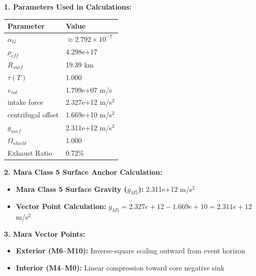 \documentclass[11pt, a4paper]{article}
\begin{document}
\vspace{0.5em}
\noindent \textbf{1. Parameters Used in Calculations:}
\begin{center}
  \begin{tabular}{|l|l|}
    \hline
    \textbf{Parameter} & \textbf{Value} \\ \hline
    $\alpha_G$ & $\approx 2.792 \times 10^{-7}$ \\ \hline
    $\rho_{eff}$ & 4.298e+17 \\ \hline
    $R_{surf}$ & 19.39 km \\ \hline
    $\tau(T)$ & 1.000 \\ \hline
    $v_{rot}$ & 1.799e+07 m/s \\ \hline
    intake force & 2.327e+12 m/s$^2$ \\ \hline
    centrifugal offset & 1.669e+10 m/s$^2$ \\ \hline
    $g_{surf}$ & 2.311e+12 m/s$^2$ \\ \hline
    $\Omega_{shield}$ & 1.000 \\ \hline
    Exhaust Ratio & 0.72\% \\ \hline
  \end{tabular}
\end{center}

\vspace{0.5em}
\noindent \textbf{2. Mara Class 5 Surface Anchor Calculation:}
\begin{itemize}
  \item \textbf{Mara Class 5 Surface Gravity ($g_{M5}$):} 2.311e+12 m/s$^2$
  \item \textbf{Vector Point Calculation:} $g_{M5} = 2.327e+12 - 1.669e+10 = 2.311e+12$ m/s$^2$
\end{itemize}

\vspace{0.5em}
\noindent \textbf{3. Mara Vector Points:}
\begin{itemize}
  \item \textbf{Exterior (M6--M10):} Inverse-square scaling outward from event horizon
  \item \textbf{Interior (M4--M0):} Linear compression toward core negative sink
\end{itemize}
\end{document}
